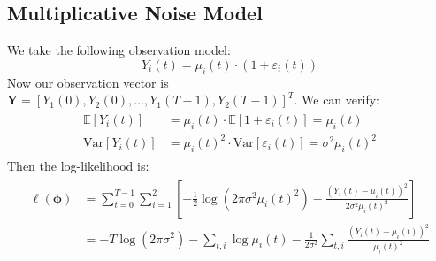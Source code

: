 \subsection{Multiplicative Noise Model}
We take the following observation model:
\begin{equation}
Y_i(t) = \mu_i(t) \cdot (1 + \varepsilon_i(t))
\end{equation}
Now our observation vector is $\mathbf{Y} = [Y_1(0), Y_2(0), \ldots,
  Y_1(T-1), Y_2(T-1)]^T$. We can verify:
\begin{align}\label{eq:moments}
  \begin{split}
    \mathbb{E}[Y_i(t)] &= \mu_i(t) \cdot \mathbb{E}[1 + \varepsilon_i(t)] = \mu_i(t) \\
    \text{Var}[Y_i(t)] &= \mu_i(t)^2 \cdot \text{Var}[\varepsilon_i(t)] = \sigma^2 \mu_i(t)^2
  \end{split}
\end{align}
Then the log-likelihood is:
\begin{align}\begin{split}
\ell(\boldsymbol{\phi}) &= \sum_{t=0}^{T-1} \sum_{i=1}^{2} \left[ -\frac{1}{2}\log(2\pi\sigma^2\mu_i(t)^2) - \frac{(Y_i(t) - \mu_i(t))^2}{2\sigma^2 \mu_i(t)^2} \right] \\
&= -T\log(2\pi\sigma^2) - \sum_{t,i} \log\mu_i(t) - \frac{1}{2\sigma^2}\sum_{t,i} \frac{(Y_i(t) - \mu_i(t))^2}{\mu_i(t)^2}
\end{split}\end{align}

